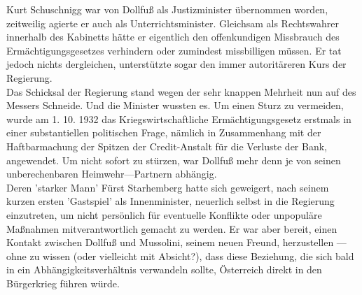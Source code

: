 \documentclass[letterpaper, 12pt]{article}
\begin{document}
Kurt Schuschnigg war von Dollfuß als Justizminister übernommen worden, zeitweilig agierte er auch als Unterrichtsminister. Gleichsam als Rechtswahrer innerhalb des Kabinetts hätte er eigentlich den offenkundigen Missbrauch des Ermächtigungsgesetzes verhindern oder zumindest missbilligen müssen. Er tat jedoch nichts dergleichen, unterstützte sogar den immer autoritäreren Kurs der Regierung. \\ Das Schicksal der Regierung stand wegen der sehr knappen Mehrheit nun auf des Messers Schneide. Und die Minister wussten es. Um einen Sturz zu vermeiden, wurde am 1. 10. 1932 das Kriegswirtschaftliche Ermächtigungsgesetz erstmals in einer substantiellen politischen Frage, nämlich in Zusammenhang mit der Haftbarmachung der Spitzen der Credit-Anstalt für die Verluste der Bank, angewendet. Um nicht sofort zu stürzen, war Dollfuß mehr denn je von seinen unberechenbaren Heimwehr—Partnern abhängig. \\ Deren 'starker Mann' Fürst Starhemberg hatte sich geweigert, nach seinem kurzen ersten 'Gastspiel' als Innenminister, neuerlich selbst in die Regierung einzutreten, um nicht persönlich für eventuelle Konflikte oder unpopuläre Maßnahmen mitverantwortlich gemacht zu werden. Er war aber bereit, einen Kontakt zwischen Dollfuß und Mussolini, seinem neuen Freund, herzustellen — ohne zu wissen (oder vielleicht mit Absicht?), dass diese Beziehung, die sich bald in ein Abhängigkeitsverhältnis verwandeln sollte, Österreich direkt in den Bürgerkrieg führen würde.
\end{document}
